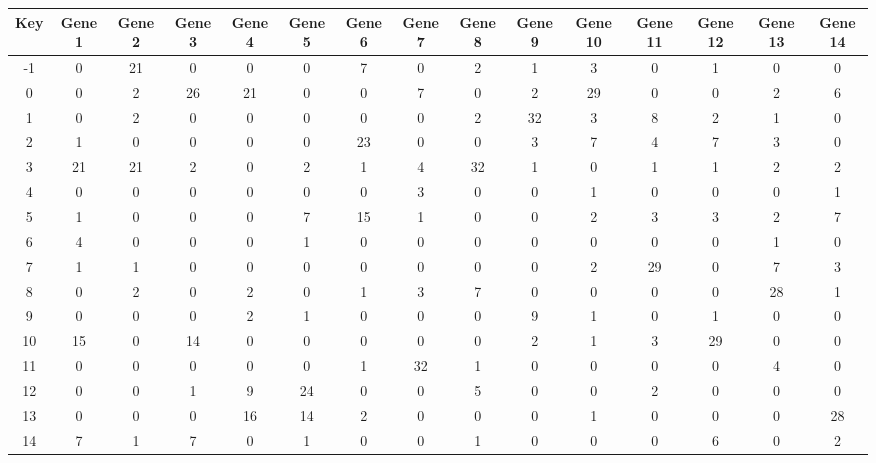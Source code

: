 \begin{tabular}{|c|c|c|c|c|c|c|c|c|c|c|c|c|c|c|}
\hline
Key & Gene 1 & Gene 2 & Gene 3 & Gene 4 & Gene 5 & Gene 6 & Gene 7 & Gene 8 & Gene 9 & Gene 10 & Gene 11 & Gene 12 & Gene 13 & Gene 14 \\
\hline
-1 & 0 & 21 & 0 & 0 & 0 & 7 & 0 & 2 & 1 & 3 & 0 & 1 & 0 & 0 \\
0 & 0 & 2 & 26 & 21 & 0 & 0 & 7 & 0 & 2 & 29 & 0 & 0 & 2 & 6 \\
1 & 0 & 2 & 0 & 0 & 0 & 0 & 0 & 2 & 32 & 3 & 8 & 2 & 1 & 0 \\
2 & 1 & 0 & 0 & 0 & 0 & 23 & 0 & 0 & 3 & 7 & 4 & 7 & 3 & 0 \\
3 & 21 & 21 & 2 & 0 & 2 & 1 & 4 & 32 & 1 & 0 & 1 & 1 & 2 & 2 \\
4 & 0 & 0 & 0 & 0 & 0 & 0 & 3 & 0 & 0 & 1 & 0 & 0 & 0 & 1 \\
5 & 1 & 0 & 0 & 0 & 7 & 15 & 1 & 0 & 0 & 2 & 3 & 3 & 2 & 7 \\
6 & 4 & 0 & 0 & 0 & 1 & 0 & 0 & 0 & 0 & 0 & 0 & 0 & 1 & 0 \\
7 & 1 & 1 & 0 & 0 & 0 & 0 & 0 & 0 & 0 & 2 & 29 & 0 & 7 & 3 \\
8 & 0 & 2 & 0 & 2 & 0 & 1 & 3 & 7 & 0 & 0 & 0 & 0 & 28 & 1 \\
9 & 0 & 0 & 0 & 2 & 1 & 0 & 0 & 0 & 9 & 1 & 0 & 1 & 0 & 0 \\
10 & 15 & 0 & 14 & 0 & 0 & 0 & 0 & 0 & 2 & 1 & 3 & 29 & 0 & 0 \\
11 & 0 & 0 & 0 & 0 & 0 & 1 & 32 & 1 & 0 & 0 & 0 & 0 & 4 & 0 \\
12 & 0 & 0 & 1 & 9 & 24 & 0 & 0 & 5 & 0 & 0 & 2 & 0 & 0 & 0 \\
13 & 0 & 0 & 0 & 16 & 14 & 2 & 0 & 0 & 0 & 1 & 0 & 0 & 0 & 28 \\
14 & 7 & 1 & 7 & 0 & 1 & 0 & 0 & 1 & 0 & 0 & 0 & 6 & 0 & 2 \\
\hline
\end{tabular}